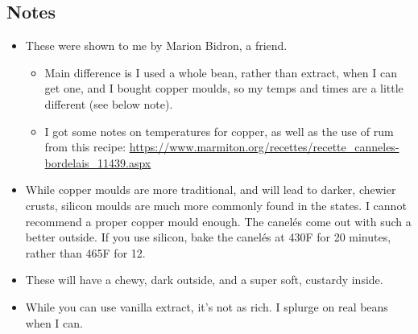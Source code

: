 \begin{multicols}{2}
\subsection*{Notes}
\begin{itemize}
    \item These were shown to me by Marion Bidron, a friend.
    \begin{itemize}
        \item Main difference is I used a whole bean, rather than extract, when I can get one, and I bought copper moulds, so my temps and times are a little different (see below note).
        \item I got some notes on temperatures for copper, as well as the use of rum from this recipe: \url{https://www.marmiton.org/recettes/recette_canneles-bordelais_11439.aspx}
    \end{itemize}
    \item While copper moulds are more traditional, and will lead to darker, chewier crusts, silicon moulds are much more commonly found in the states. I cannot recommend a proper copper mould enough. The canelés come out with such a better outside. If you use silicon, bake the canelés at 430F for 20 minutes, rather than 465F for 12.
    \item These will have a chewy, dark outside, and a super soft, custardy inside.
    \item While you can use vanilla extract, it's not as rich. I splurge on real beans when I can.
\end{itemize}
\end{multicols}
\clearpage